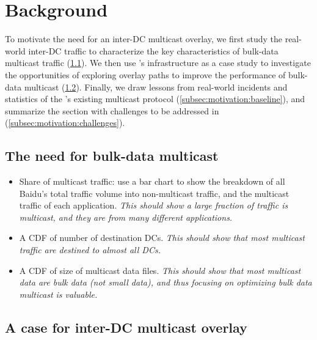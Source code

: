 \section{Background}
\label{sec:motivation}


To motivate the need for an inter-DC multicast overlay, we first 
study the real-world inter-DC traffic to characterize the key 
characteristics of bulk-data multicast traffic
(\Section\ref{subsec:motivation:multicast-traffic}). 
We then use \company's infrastructure as a case study to 
investigate the opportunities of exploring overlay paths to improve
the performance of bulk-data multicast
(\Section\ref{subsec:motivation:case-for}). 
Finally, we draw lessons from real-world incidents and statistics
of the \company's existing multicast protocol
(\Section\ref{subsec:motivation:baseline}), and summarize
the section with challenges to be addressed in \name 
(\Section\ref{subsec:motivation:challenges}).


\subsection{The need for bulk-data multicast}
\label{subsec:motivation:multicast-traffic}

\begin{itemize}

\item Share of multicast traffic: use a bar chart to show the breakdown of all Baidu's total traffic volume into non-multicast traffic, and the multicast traffic of each application. {\em This should show a large fraction of traffic is multicast, and they are from many different applications.}

\item A CDF of number of destination DCs. {\em This should show that most multicast traffic are destined to almost all DCs.}

\item A CDF of size of multicast data files. {\em This should show that most multicast data are bulk data (not small data), and thus focusing on optimizing bulk data multicast is valuable.}

\end{itemize}

\subsection{A case for inter-DC multicast overlay}
\label{subsec:motivation:case-for}

